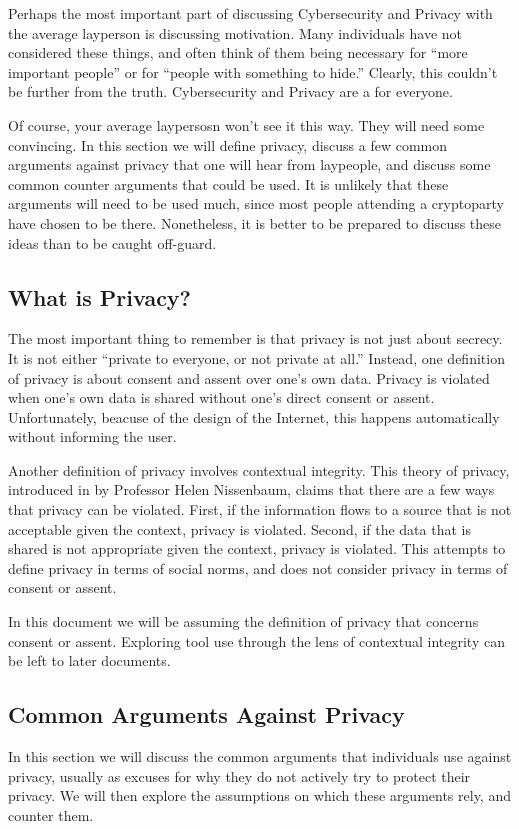 Perhaps the most important part of discussing Cybersecurity and Privacy with the average layperson is discussing motivation. Many individuals have not considered these things, and often think of them being necessary for ``more important people'' or for ``people with something to hide.'' Clearly, this couldn't be further from the truth. Cybersecurity and Privacy are a for everyone.

Of course, your average laypersosn won't see it this way. They will need some convincing. In this section we will define privacy, discuss a few common arguments against privacy that one will hear from laypeople, and discuss some common counter arguments that could be used. It is unlikely that these arguments will need to be used much, since most people attending a cryptoparty have chosen to be there. Nonetheless, it is better to be prepared to discuss these ideas than to be caught off-guard.

\subsection{What is Privacy?}

The most important thing to remember is that privacy is not just about secrecy. It is not either ``private to everyone, or not private at all.'' Instead, one definition of privacy is about consent and assent over one's own data. Privacy is violated when one's own data is shared without one's direct consent or assent. Unfortunately, beacuse of the design of the Internet, this happens automatically without informing the user. 

Another definition of privacy involves contextual integrity. This theory of privacy, introduced in \cite{nissenbaumPrivacy} by Professor Helen Nissenbaum, claims that there are a few ways that privacy can be violated. First, if the information flows to a source that is not acceptable given the context, privacy is violated. Second, if the data that is shared is not appropriate given the context, privacy is violated. This attempts to define privacy in terms of social norms, and does not consider privacy in terms of consent or assent.

In this document we will be assuming the definition of privacy that concerns consent or assent. Exploring tool use through the lens of contextual integrity can be left to later documents.

\subsection{Common Arguments Against Privacy}
\label{subsec:arguments}
In this section we will discuss the common arguments that individuals use against privacy, usually as excuses for why they do not actively try to protect their privacy. We will then explore the assumptions on which these arguments rely, and counter them.

